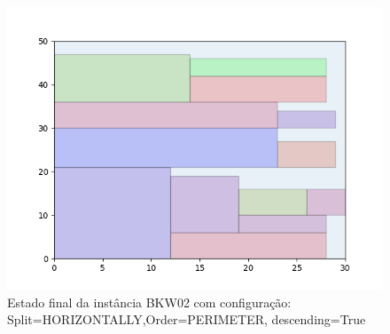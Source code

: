 \begin{figure}[H]
    \centering
    \caption[]{Estado final da instância BKW02 com configuração: Split=HORIZONTALLY,Order=PERIMETER, descending=True}
    \label{fig:bkw02-horizontally-perimeter-true}
    \includegraphics[scale=0.5]{output/figures/bkw/bkw02/horizontally/perimeter/true/00}
\end{figure}